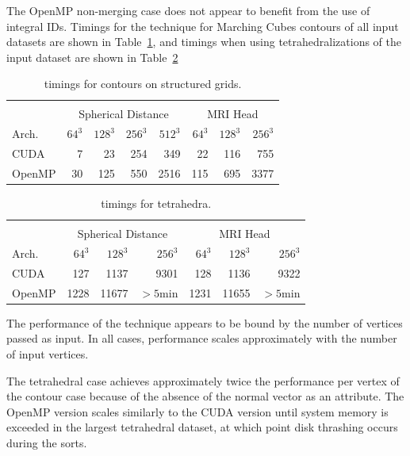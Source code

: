 \documentclass[review,journal]{vgtc}         %
\begin{document}
The OpenMP non-merging case does not appear to benefit from the use of integral IDs. Timings for the  technique for Marching Cubes contours of all input datasets are shown in Table~\ref{tab:vertexwelding}, and timings when using tetrahedralizations of the input dataset are shown in Table~\ref{tab:vertexweldingtetrahedra}

\begin{table}[tb!]
\begin{center}
\caption{ timings for contours on structured grids.}
\label{tab:vertexwelding}
\begin{tabular}{l|r r r r|r r r}
\multicolumn{8}{c}{ } \\
 & \multicolumn{4}{|c|}{Spherical Distance} & \multicolumn{3}{|c}{MRI Head}\\
Arch. & $64^3$ & $128^3$ & $256^3$ & $512^3$ & $64^3$ & $128^3$ & $256^3$\\
\hline
CUDA & 7 & 23 & 254 & 349 & 22 & 116 & 755 \\
OpenMP & 30 & 125 & 550 & 2516 & 115 & 695 & 3377 \\
\end{tabular}
\end{center}
\end{table}

\begin{table}[tb!]
\begin{center}
\caption{ timings for tetrahedra.}
\label{tab:vertexweldingtetrahedra}
\begin{tabular}{l|r r r|r r r}
\multicolumn{7}{c}{ } \\
 & \multicolumn{3}{|c|}{Spherical Distance} & \multicolumn{3}{|c}{MRI Head}\\
Arch. & $64^3$ & $128^3$ & $256^3$ & $64^3$ & $128^3$ & $256^3$\\
\hline
CUDA & 127 & 1137 & 9301 & 128 & 1136 & 9322 \\
OpenMP & 1228 & 11677 & $>5$min & 1231 & 11655 & $>5$min \\
\end{tabular}
\end{center}
\end{table}

The performance of the technique appears to be bound by the number of vertices passed as input. In all cases, performance scales approximately with the number of input vertices. 

The tetrahedral case achieves approximately twice the performance per vertex of the contour case because of the absence of the normal vector as an attribute. The OpenMP version scales similarly to the CUDA version until system memory is exceeded in the largest tetrahedral dataset, at which point disk thrashing occurs during the sorts.
\end{document}

